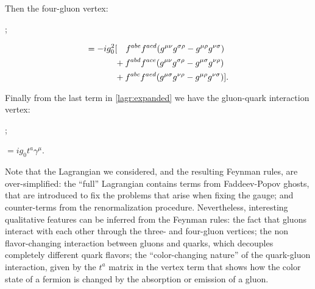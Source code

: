Then the four-gluon vertex:
\begin{center}
    \begin{minipage}{0.4\textwidth}
        \hspace{2cm};
    \end{minipage}
    \begin{minipage}{0.58\textwidth}
        \begin{align}\nonumber = -ig_0^2&
        [~~~f^{abe}f^{acd}(g^{\mu\nu}g^{\sigma\rho} - g^{\mu\rho}g^{\nu\sigma}) \hfill \\\nonumber
        &+f^{abd}f^{ace}(g^{\mu\nu}g^{\sigma\rho} - g^{\mu\sigma}g^{\nu\rho})\hfill  \\\nonumber 
        &+f^{abc}f^{aed}(g^{\mu\sigma}g^{\nu\rho} - g^{\mu\rho}g^{\nu\sigma})].\hfill 
        \end{align}
    \end{minipage}
\end{center}
Finally from the last term in \cref{lagr:expanded} we have the gluon-quark interaction vertex:
\begin{center}
    \begin{minipage}{0.4\textwidth}
        \hspace{2cm};
    \end{minipage}
    \begin{minipage}{0.58\textwidth}
        \hspace{1.8cm} $ = ig_0t^a\gamma^\mu$.
    \end{minipage}
\end{center}
Note that the Lagrangian we considered, and the resulting Feynman rules, are over-simplified: the ``full'' Lagrangian contains terms from Faddeev-Popov ghosts, that are introduced to fix the problems that arise when fixing the gauge; and counter-terms from the renormalization procedure. Nevertheless, interesting qualitative features can be inferred from the Feynman rules: the fact that gluons interact with each other through the three- and four-gluon vertices; the non flavor-changing interaction between gluons and quarks, which decouples completely different quark flavors; the ``color-changing nature'' of the quark-gluon interaction, given by the $t^a$ matrix in the vertex term that shows how the color state of a fermion is changed by the absorption or emission of a gluon.\\
 

